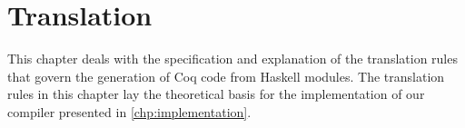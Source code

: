 \chapter{Translation} \label{chp:translation}
This chapter deals with the specification and explanation of the translation rules that govern the generation of Coq code from Haskell modules.
The translation rules in this chapter lay the theoretical basis for the implementation of our compiler presented in \autoref{chp:implementation}.





